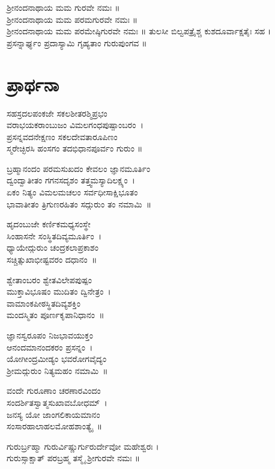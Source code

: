 ಶ್ರೀನಂದನಾಥಾಯ ಮಮ ಗುರವೇ ನಮಃ ॥\\
ಶ್ರೀನಂದನಾಥಾಯ ಮಮ ಪರಮಗುರವೇ ನಮಃ ॥\\
ಶ್ರೀನಂದನಾಥಾಯ ಮಮ ಪರಮೇಷ್ಠಿಗುರವೇ ನಮಃ ॥
\newpage
ತುಲಸೀ ಬಿಲ್ವಪತ್ರೈಶ್ಚ ಕುಶದೂರ್ವಾಕ್ಷತೈಃ ಸಹ ।\\
ಪ್ರಸನ್ನಾರ್ಘ್ಯಂ ಪ್ರದಾಸ್ಯಾಮಿ ಗೃಹ್ಯತಾಂ ಗುರುಪುಂಗವ ॥\\

\section{ಪ್ರಾರ್ಥನಾ}
ಸಹಸ್ರದಲಪಂಕಜೇ ಸಕಲಶೀತರಶ್ಮಿಪ್ರಭಂ\\
ವರಾಭಯಕರಾಂಬುಜಂ ವಿಮಲಗಂಧಪುಷ್ಪಾಂಬರಂ~।\\
ಪ್ರಸನ್ನವದನೇಕ್ಷಣಂ ಸಕಲದೇವತಾರೂಪಿಣಂ\\
ಸ್ಮರೇಚ್ಛಿರಸಿ ಹಂಸಗಂ ತದಭಿಧಾನಪೂರ್ವಂ ಗುರುಂ ॥

ಬ್ರಹ್ಮಾನಂದಂ ಪರಮಸುಖದಂ ಕೇವಲಂ ಜ್ಞಾನಮೂರ್ತಿಂ\\
ದ್ವಂದ್ವಾತೀತಂ ಗಗನಸದೃಶಂ ತತ್ತ್ವಮಸ್ಯಾದಿಲಕ್ಷ್ಯಂ~।\\
ಏಕಂ ನಿತ್ಯಂ ವಿಮಲಮಚಲಂ ಸರ್ವಧೀಸಾಕ್ಷಿಭೂತಂ\\
ಭಾವಾತೀತಂ ತ್ರಿಗುಣರಹಿತಂ ಸದ್ಗುರುಂ ತಂ ನಮಾಮಿ~॥

ಹೃದಂಬುಜೇ ಕರ್ಣಿಕಮಧ್ಯಸಂಸ್ಥೇ\\ ಸಿಂಹಾಸನೇ ಸಂಸ್ಥಿತದಿವ್ಯಮೂರ್ತಿಂ~।\\
ಧ್ಯಾಯೇದ್ಗುರುಂ ಚಂದ್ರಕಲಾಪ್ರಕಾಶಂ\\ ಸಚ್ಚಿತ್ಸುಖಾಭೀಷ್ಟವರಂ ದಧಾನಂ~॥

ಶ್ವೇತಾಂಬರಂ ಶ್ವೇತವಿಲೇಪಪುಷ್ಪಂ\\ ಮುಕ್ತಾವಿಭೂಷಂ ಮುದಿತಂ ದ್ವಿನೇತ್ರಂ~।\\
ವಾಮಾಂಕಪೀಠಸ್ಥಿತದಿವ್ಯಶಕ್ತಿಂ\\ ಮಂದಸ್ಮಿತಂ ಪೂರ್ಣಕೃಪಾನಿಧಾನಂ~॥

ಜ್ಞಾನಸ್ವರೂಪಂ ನಿಜಭಾವಯುಕ್ತಂ\\ ಆನಂದಮಾನಂದಕರಂ ಪ್ರಸನ್ನಂ~।\\
ಯೋಗೀಂದ್ರಮೀಡ್ಯಂ ಭವರೋಗವೈದ್ಯಂ\\ ಶ್ರೀಮದ್ಗುರುಂ ನಿತ್ಯಮಹಂ ನಮಾಮಿ~॥

ವಂದೇ ಗುರೂಣಾಂ ಚರಣಾರವಿಂದಂ\\ ಸಂದರ್ಶಿತಸ್ವಾತ್ಮಸುಖಾವಬೋಧಮ್~।\\
ಜನಸ್ಯ ಯೋ ಜಾಂಗಲಿಕಾಯಮಾನಂ \\ಸಂಸಾರಹಾಲಾಹಲಮೋಹಶಾಂತ್ಯೈ~॥

ಗುರುರ್ಬ್ರಹ್ಮಾ ಗುರುರ್ವಿಷ್ಣುರ್ಗುರುರ್ದೇವೋ ಮಹೇಶ್ವರಃ ।\\
ಗುರುಸ್ಸಾಕ್ಷಾತ್ ಪರಬ್ರಹ್ಮ ತಸ್ಮೈ ಶ್ರೀಗುರವೇ ನಮಃ ॥
